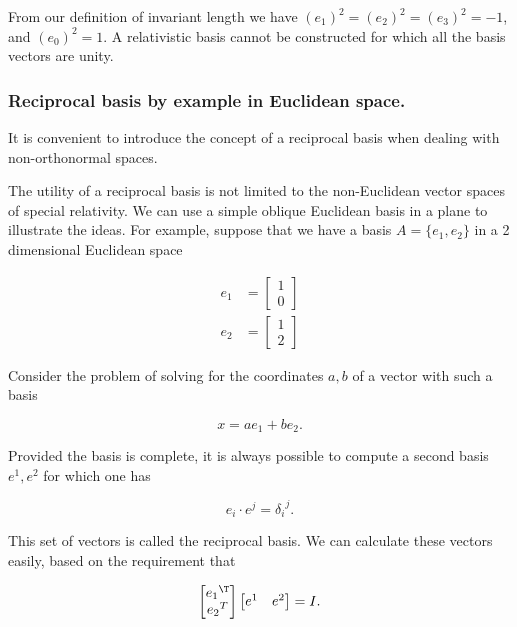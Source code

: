 From our definition of invariant length we have $(e_1)^2 = (e_2)^2 = (e_3)^2 = -1$, and $(e_0)^2 = 1$.  A relativistic basis cannot be constructed for which all the basis vectors are unity.

\subsubsection{Reciprocal basis by example in Euclidean space.}

It is convenient to introduce the concept of a reciprocal basis when dealing with non-orthonormal spaces.

The utility of a reciprocal basis is not limited to the non-Euclidean vector spaces of special relativity.  We can use a simple oblique Euclidean basis in a plane to illustrate the ideas.  For example, suppose that we have a basis $A = \{e_1, e_2\}$ in a 2 dimensional Euclidean space

\begin{equation}\label{eqn:grahamSchmidtLorentz:90}
\begin{aligned}
e_1 &=
\begin{bmatrix}
1 \\
0
\end{bmatrix} \\
e_2 &=
\begin{bmatrix}
1 \\
2
\end{bmatrix}
\end{aligned}
\end{equation}

Consider the problem of solving for the coordinates $a,b$ of a vector with such a basis

\begin{equation}\label{eqn:grahamSchmidtLorentz:110}
x = a e_1 + b e_2.
\end{equation}

Provided the basis is complete, it is always possible to compute a second basis ${e^1, e^2}$ for which one has

\begin{equation}\label{eqn:grahamSchmidtLorentz:130}
e_i \cdot e^j = {\delta_i}^j.
\end{equation}

This set of vectors is called the reciprocal basis.  We can calculate these vectors easily, based on the requirement that

\begin{equation}\label{eqn:grahamSchmidtLorentz:150}
\begin{bmatrix}
{e_1}^\T \\
{e_2}^T
\end{bmatrix}
\begin{bmatrix}
e^1 & e^2
\end{bmatrix} = I.
\end{equation}

